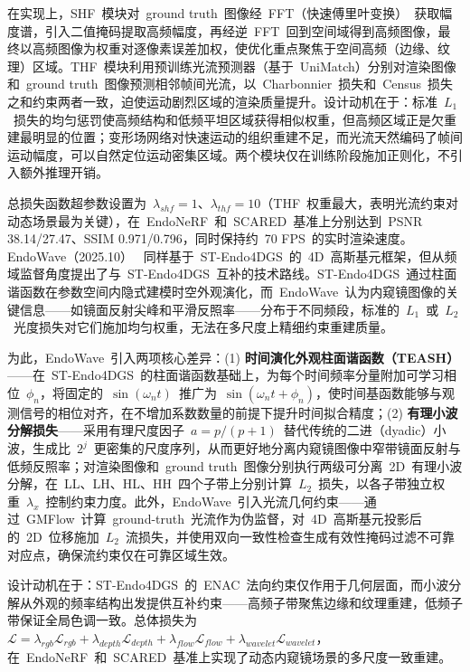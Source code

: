 在实现上，SHF~模块对~ground truth~图像经~FFT（快速傅里叶变换）~获取幅度谱，引入二值掩码提取高频幅度，再经逆~FFT~回到空间域得到高频图像，最终以高频图像为权重对逐像素误差加权，使优化重点聚焦于空间高频（边缘、纹理）区域。THF~模块利用预训练光流预测器（基于~UniMatch）分别对渲染图像和~ground truth~图像预测相邻帧间光流，以~Charbonnier~损失和~Census~损失之和约束两者一致，迫使运动剧烈区域的渲染质量提升。设计动机在于：标准~$L_1$~损失的均匀惩罚使高频结构和低频平坦区域获得相似权重，但高频区域正是欠重建最明显的位置；变形场网络对快速运动的组织重建不足，而光流天然编码了帧间运动幅度，可以自然定位运动密集区域。两个模块仅在训练阶段施加正则化，不引入额外推理开销。

总损失函数超参数设置为~$\lambda_{shf}=1$、$\lambda_{thf}=10$（THF~权重最大，表明光流约束对动态场景最为关键），在~EndoNeRF~和~SCARED~基准上分别达到~PSNR 38.14/27.47、SSIM 0.971/0.796，同时保持约~70 FPS~的实时渲染速度。EndoWave（2025.10）~\cite{2510_23087} 同样基于~ST-Endo4DGS~的~4D~高斯基元框架，但从频域监督角度提出了与~ST-Endo4DGS~互补的技术路线。ST-Endo4DGS~通过柱面谐函数在参数空间内隐式建模时空外观演化，而~EndoWave~认为内窥镜图像的关键信息——如镜面反射尖峰和平滑反照率——分布于不同频段，标准的~$L_1$~或~$L_2$~光度损失对它们施加均匀权重，无法在多尺度上精细约束重建质量。

为此，EndoWave~引入两项核心差异：(1) \textbf{时间演化外观柱面谐函数（TEASH）}——在~ST-Endo4DGS~的柱面谐函数基础上，为每个时间频率分量附加可学习相位~$\phi_n$，将固定的~$\sin(\omega_n t)$~推广为~$\sin(\omega_n t + \phi_n)$，使时间基函数能够与观测信号的相位对齐，在不增加系数数量的前提下提升时间拟合精度；(2) \textbf{有理小波分解损失}——采用有理尺度因子~$a = p/(p+1)$~替代传统的二进（dyadic）小波，生成比~$2^j$~更密集的尺度序列，从而更好地分离内窥镜图像中窄带镜面反射与低频反照率；对渲染图像和~ground truth~图像分别执行两级可分离~2D~有理小波分解，在~LL、LH、HL、HH~四个子带上分别计算~$L_2$~损失，以各子带独立权重~$\lambda_x$~控制约束力度。此外，EndoWave~引入光流几何约束——通过~GMFlow~计算~ground-truth~光流作为伪监督，对~4D~高斯基元投影后的~2D~位移施加~$L_2$~流损失，并使用双向一致性检查生成有效性掩码过滤不可靠对应点，确保流约束仅在可靠区域生效。

设计动机在于：ST-Endo4DGS~的~ENAC~法向约束仅作用于几何层面，而小波分解从外观的频率结构出发提供互补约束——高频子带聚焦边缘和纹理重建，低频子带保证全局色调一致。总体损失为~$\mathcal{L} = \lambda_{rgb}\mathcal{L}_{rgb} + \lambda_{depth}\mathcal{L}_{depth} + \lambda_{flow}\mathcal{L}_{flow} + \lambda_{wavelet}\mathcal{L}_{wavelet}$，在~EndoNeRF~和~SCARED~基准上实现了动态内窥镜场景的多尺度一致重建。


